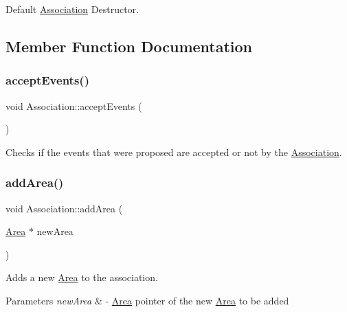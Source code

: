 Default \mbox{\hyperlink{classAssociation}{Association}} Destructor. 



\subsection{Member Function Documentation}
\mbox{\label{classAssociation_a944406d8918729d1b9f0c7b5e34997d2}} 
\subsubsection{\texorpdfstring{accept\+Events()}{acceptEvents()}}
{\footnotesize\ttfamily void Association\+::accept\+Events (\begin{DoxyParamCaption}{ }\end{DoxyParamCaption})}



Checks if the events that were proposed are accepted or not by the \mbox{\hyperlink{classAssociation}{Association}}. 

\mbox{\label{classAssociation_a33ebf26ce910d02ce8a702e4ff86551b}} 
\subsubsection{\texorpdfstring{add\+Area()}{addArea()}}
{\footnotesize\ttfamily void Association\+::add\+Area (\begin{DoxyParamCaption}\item[{\mbox{\hyperlink{classArea}{Area}} $\ast$}]{new\+Area }\end{DoxyParamCaption})}



Adds a new \mbox{\hyperlink{classArea}{Area}} to the association. 


\begin{DoxyParams}{Parameters}
{\em new\+Area} & -\/ \mbox{\hyperlink{classArea}{Area}} pointer of the new \mbox{\hyperlink{classArea}{Area}} to be added \\
\hline
\end{DoxyParams}
\mbox{\label{classAssociation_ac77af0215fb992c31d4a048a00f642b9}} 
